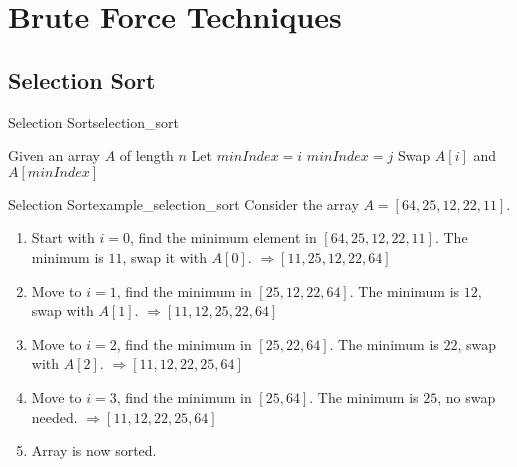 \chapter{Brute Force Techniques}
\section{Selection Sort}
\begin{algorithmtcb}
    {Selection Sort}{selection_sort}
    \begin{algorithmic}
        \State{} Given an array $A$ of length $n$
            \State{} Let $minIndex = i$
                    \State{} $minIndex = j$
                \EndIf{}
            \EndFor{}
            \State{} Swap $A[i]$ and $A[minIndex]$
        \EndFor{} 
    \end{algorithmic}
\end{algorithmtcb}

\begin{exampletcb}
    {Selection Sort}{example_selection_sort}
    Consider the array $A = [64, 25, 12, 22, 11]$.

    \begin{enumerate}
        \item Start with $i = 0$, find the minimum element in $[64, 25, 12, 22, 11]$. The minimum is $11$, swap it with $A[0]$.
            \newline $\Rightarrow [11, 25, 12, 22, 64]$
        \item Move to $i = 1$, find the minimum in $[25, 12, 22, 64]$. The minimum is $12$, swap with $A[1]$.
            \newline $\Rightarrow [11, 12, 25, 22, 64]$
        \item Move to $i = 2$, find the minimum in $[25, 22, 64]$. The minimum is $22$, swap with $A[2]$.
            \newline $\Rightarrow [11, 12, 22, 25, 64]$
        \item Move to $i = 3$, find the minimum in $[25, 64]$. The minimum is $25$, no swap needed.
            \newline $\Rightarrow [11, 12, 22, 25, 64]$
        \item Array is now sorted.
    \end{enumerate}
\end{exampletcb}


